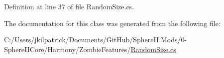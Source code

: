 Definition at line 37 of file Random\+Size.\+cs.



The documentation for this class was generated from the following file\+:\begin{DoxyCompactItemize}
\item 
C\+:/\+Users/jkilpatrick/\+Documents/\+Git\+Hub/\+Sphere\+I\+I.\+Mods/0-\/\+Sphere\+I\+I\+Core/\+Harmony/\+Zombie\+Features/\mbox{\hyperlink{_random_size_8cs}{Random\+Size.\+cs}}\end{DoxyCompactItemize}
